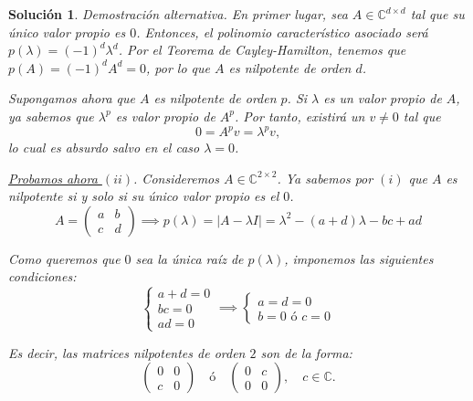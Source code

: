 \documentclass[11pt, a4paper]{article}
\newif\IfInSansMode
\numberwithin{equation}{section}
\theoremstyle{theorem-style}
\theoremstyle{definition-style}
\theoremstyle{remark-style}
\newtheorem*{sol}{Solución}
\theoremstyle{example-style}
\begin{document}
\begin{sol}
        \textit{Demostración alternativa}. En primer lugar, sea $A \in \mathbb{C}^{d\times d}$ tal que su único valor propio es $0$. Entonces, el polinomio característico asociado será $p(\lambda) = (-1)^d\lambda^d$. Por el \textit{Teorema de Cayley-Hamilton}, tenemos que $p(A) = (-1)^dA^d = 0$, por lo que $A$ es nilpotente de orden $d$.
        
        Supongamos ahora que $A$ es nilpotente de orden $p$. Si $\lambda$ es un valor propio de $A$, ya sabemos que $\lambda^p$ es valor propio de $A^p$. Por tanto, existirá un $v \neq 0$ tal que $$ 0 = A^p v =  \lambda^p v,$$ lo cual es absurdo salvo en el caso $\lambda = 0$.

        \underline{Probamos ahora $(ii)$}. Consideremos $A \in \mathbb{C}^{2\times 2}$. Ya sabemos por $(i)$ que $A$ es nilpotente si y solo si su único valor propio es el $0$. $$A = \begin{pmatrix}
        a & b\\
        c & d
\end{pmatrix} \implies p(\lambda) = |A - \lambda I| = \lambda^2 - (a+d)\lambda - bc + ad$$

Como queremos que $0$ sea la única raíz de $p(\lambda)$, imponemos las siguientes condiciones: $$\begin{cases}
	a + d = 0\\
	bc = 0\\
	ad = 0
\end{cases} \implies 
\begin{cases}
	a = d = 0\\
	b = 0 \text{ ó } c = 0
\end{cases}$$

Es decir, las matrices nilpotentes de orden $2$ son de la forma: $$\begin{pmatrix}
0 & 0\\
c & 0	
\end{pmatrix} \quad \text{ó} \quad 
\begin{pmatrix}
0 & c\\
0 & 0	    
\end{pmatrix}, \quad c \in \mathbb{C}.$$
    \end{sol}
    
\end{document}
